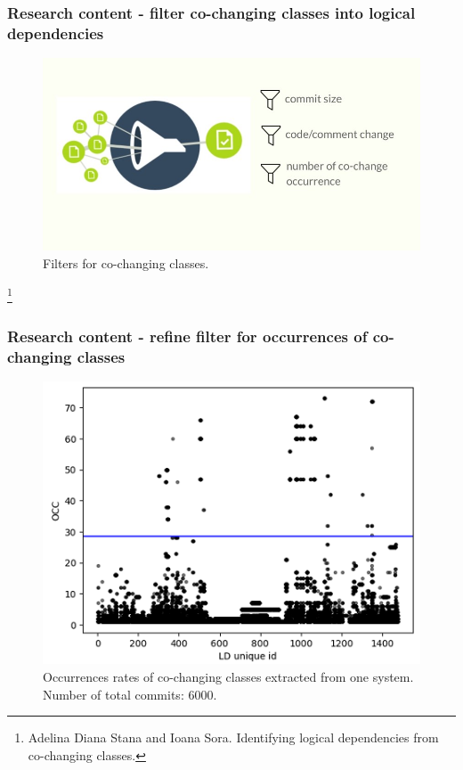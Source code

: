 \documentclass{beamer}
\begin{document}
 \begin{frame}
\frametitle{Research content - filter co-changing classes into logical dependencies}
\begin{center}
     \begin{figure}
	\includegraphics[width=\textwidth]{filter.jpg}
	\caption{\label{fig:fig3}Filters for co-changing classes.}
     \end{figure}
\end{center}
\footnote{Adelina Diana Stana and Ioana Sora. Identifying logical dependencies from co-changing classes. }

\end{frame}

 \begin{frame}
\frametitle{Research content - refine filter for occurrences of co-changing classes}

\begin{center}
     \begin{figure}
	\includegraphics[width= 9.0 cm]{filter_occ.PNG}
	\caption{\label{fig:fig4} Occurrences rates of co-changing classes extracted from one system. Number of total commits: 6000. }
     \end{figure}
\end{center}

\end{frame}
\end{document}
